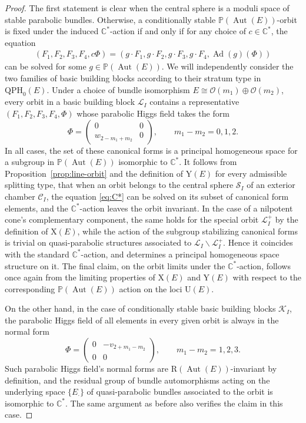 \documentclass[pdftex]{sigma}
\newcommand{\field}[1]{\ensuremath{\mathbb{#1}}}
\newcommand{\CC}{\field{C}}
\newcommand{\PP}{\field{P}}
\newcommand{\calO}{\mathcal{O}}
\newcommand{\curly}[1]{\mathscr{#1}}
\newcommand{\cK}{\curly{K}}
\newcommand{\cL}{\curly{L}}
\newcommand{\cS}{\curly{S}}
\newcommand{\qC}{\mathcal{C}}
\newcommand{\qp}{\boldsymbol{\cdot}}
\DeclareMathOperator{\Ad}{Ad}
\DeclareMathOperator{\Aut}{Aut}
\numberwithin{equation}{section}
\begin{document}
\begin{proof}
The first statement is clear when the central sphere is a moduli space of stable parabolic bundles. Otherwise, %
a conditionally stable $\PP(\Aut(E))$-orbit is fixed under the induced $\CC^{*}$-action if and only if for any choice of $c\in \CC^{*}$, the equation
\begin{gather}\label{eq:C*}
(F_{1},F_{2},F_{3},F_{4},c\Phi) = (g\cdot F_{1},g\cdot F_{2},g\cdot F_{3},g\cdot F_{4},\Ad(g)(\Phi))
\end{gather}
can be solved for some $g\in\PP(\Aut(E))$.
We will independently consider the two families of basic building blocks according to their stratum type in $\mathrm{QPH}_{0}(E)$. Under a choice of bundle isomorphism $E\cong \calO(m_{1})\oplus\calO(m_{2})$, every orbit in a basic building block $\cL_{I}$ contains a representative $(F_{1},F_{2},F_{3},F_{4},\Phi)$ whose parabolic Higgs field takes the form
\[
\Phi = \begin{pmatrix}
0 & 0\\
w_{2-m_{1}+m_{2}} & 0
\end{pmatrix}\!,\qquad m_{1}-m_{2} = 0,1,2.
\]
In all cases, the set of these canonical forms is a principal homogeneous space for a subgroup in $\PP(\Aut(E))$ isomorphic to $\CC^{*}$. It follows from Proposition~\ref{prop:line-orbit} and
the definition of $\mathrm{Y}(E)$ for every admissible splitting type, that when an orbit belongs to the central sphere $\cS_{I}$ of an exterior chamber $\qC_{I}$, the equation \eqref{eq:C*} can be solved on its subset of canonical form elements, and the $\CC^{*}$-action leaves the orbit invariant. In the case of a nilpotent cone's complementary component, the same holds for the special orbit $\cL^{+}_{I}$ by the definition of $\mathrm{X}(E)$, while the action of the subgroup stabilizing canonical forms is trivial on quasi-parabolic structures associated to $\cL_{I}\backslash\cL^{+}_{I}$. Hence it coincides with the standard $\CC^{*}$-action, and determines a principal homogeneous space structure on it. The final claim, on the orbit limits under the $\CC^{*}$-action, follows once again from the limiting properties of $\mathrm{X}(E)$ and $\mathrm{Y}(E)$ with respect to the corresponding $\PP(\Aut(E))$ action on the loci $\mathrm{U}(E)$.

On the other hand, in the case of conditionally stable basic building blocks $\cK_{I}$, the parabolic Higgs field of all elements in every given orbit is always in the normal form
\[
\Phi = \begin{pmatrix}
0 & -v_{2+ m_{1} - m_{2}}\\
0 & 0
\end{pmatrix}\!,\qquad m_{1} - m_{2} = 1, 2, 3.
\]
Such parabolic Higgs field's normal forms are $\mathrm{R}(\Aut(E))$-invariant by definition, and the residual group of bundle automorphisms acting on the underlying space $\{E_{\qp}\}$ of quasi-parabolic bundles associated to the orbit is isomorphic to $\CC^{*}$. The same argument as before also verifies the claim in this case.
\end{proof}
\end{document}
